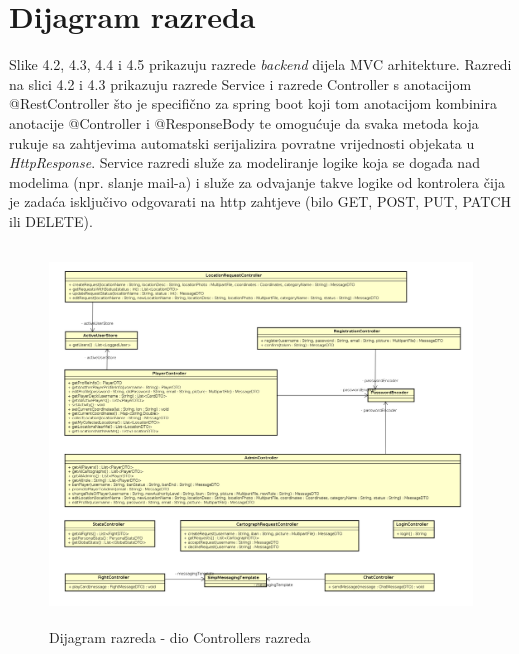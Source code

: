 			\eject
			
			
		\section{Dijagram razreda}
		
			{Slike 4.2, 4.3, 4.4 i 4.5 prikazuju razrede \textit{backend} dijela MVC arhitekture. Razredi na slici 4.2 i 4.3 prikazuju razrede Service i razrede Controller s anotacijom @RestController što je specifično za spring boot koji tom anotacijom kombinira anotacije @Controller i @ResponseBody te omogućuje da svaka metoda koja rukuje sa zahtjevima automatski serijalizira povratne vrijednosti objekata u \textit{HttpResponse}. Service razredi služe za modeliranje logike koja se događa nad modelima (npr. slanje mail-a) i služe za odvajanje takve logike od kontrolera čija je zadaća isključivo odgovarati na http zahtjeve (bilo GET, POST, PUT, PATCH ili DELETE).}
			
			\begin{figure}[H]
				\includegraphics[width=17cm, height=10cm]{dijagrami/controllers_diagram}				
				\centering
				\caption{Dijagram razreda - dio Controllers razreda}
				\label{}
			\end{figure}
		
